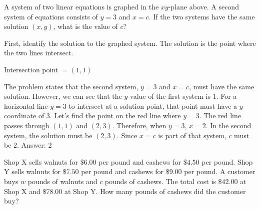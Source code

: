 \documentclass[11pt,paper=a4,answers]{exam}
\begin{document}
\begin{questions}
\vspace{1cm}

\question
\begin{center}
\end{center}
A system of two linear equations is graphed in the $xy$-plane above. A second system of equations consists of $y = 3$ and $x = c$. If the two systems have the same solution $(x, y)$, what is the value of $c$?

\begin{solution}
First, identify the solution to the graphed system. The solution is the point where the two lines intersect.
\vspace{5pt}
\begin{center}
Intersection point $= (1, 1)$
\end{center}
\vspace{5pt}
The problem states that the second system, $y = 3$ and $x = c$, must have the same solution. However, we can see that the $y$-value of the first system is $1$. For a horizontal line $y=3$ to intersect at a solution point, that point must have a $y$-coordinate of $3$.
\vspace{5pt}
Let's find the point on the red line where $y=3$. The red line passes through $(1,1)$ and $(2,3)$. Therefore, when $y=3$, $x=2$.
\vspace{5pt}
In the second system, the solution must be $(2, 3)$. Since $x=c$ is part of that system, $c$ must be $2$.
\vspace{5pt}
Answer: \colorbox{yellow!100}{2}
\end{solution}

\vspace{1cm}

\question
Shop X sells walnuts for $\$6.00$ per pound and cashews for $\$4.50$ per pound. Shop Y sells walnuts for $\$7.50$ per pound and cashews for $\$9.00$ per pound. A customer buys $w$ pounds of walnuts and $c$ pounds of cashews. The total cost is $\$42.00$ at Shop X and $\$78.00$ at Shop Y. How many pounds of cashews did the customer buy?


\end{questions}
\end{document}
